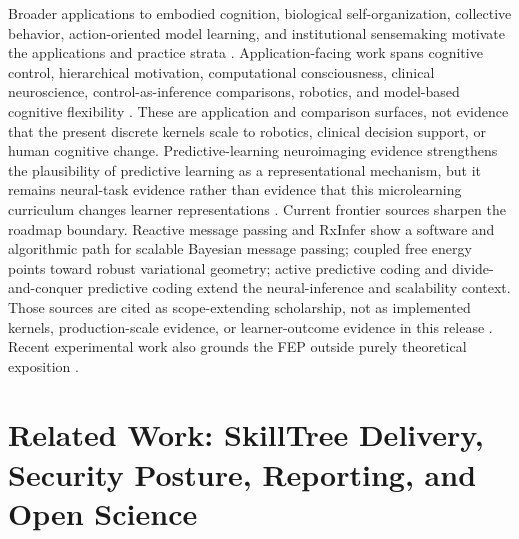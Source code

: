 \documentclass[
  english,
]{article}
\begin{document}
Broader applications to embodied cognition, biological
self-organization, collective behavior, action-oriented model learning,
and institutional sensemaking motivate the applications and practice
strata
\citep{clark2016surfing, friston2013life, tschantz2020learning, ramstead2018answering, friston2019particular}.
Application-facing work spans cognitive control, hierarchical
motivation, computational consciousness, clinical neuroscience,
control-as-inference comparisons, robotics, and model-based cognitive
flexibility
\citep{pezzulo2012cognitive_control, pezzulo2018hierarchical_active_inference, vilas2022active_consciousness, smith2021clinical_predictive_coding, pezzulo2023generating_meaning, watson2020active_control_inference, millidge2020active_control_relationship, schwartenbeck2015addiction_active_bayes, lanillos2021active_robotics_survey, catal2021robot_navigation_active_inference, queisser2021robot_active_inference, sales2019cognitive_flexibility_active_inference}.
These are application and comparison surfaces, not evidence that the
present discrete kernels scale to robotics, clinical decision support,
or human cognitive change. Predictive-learning neuroimaging evidence
strengthens the plausibility of predictive learning as a
representational mechanism, but it remains neural-task evidence rather
than evidence that this microlearning curriculum changes learner
representations \citep{greco2024predictive_learning_geometry}. Current
frontier sources sharpen the roadmap boundary. Reactive message passing
and RxInfer show a software and algorithmic path for scalable Bayesian
message passing; coupled free energy points toward robust variational
geometry; active predictive coding and divide-and-conquer predictive
coding extend the neural-inference and scalability context. Those
sources are cited as scope-extending scholarship, not as implemented
kernels, production-scale evidence, or learner-outcome evidence in this
release
\citep{bagaev2023reactive_message_passing, bagaev2023rxinfer, nelson2025coupled_free_energy, rao2024active_predictive_coding, sennesh2024dcpc}.
Recent experimental work also grounds the FEP outside purely theoretical
exposition \citep{isomura2023experimental}.

\newpage

\section{Related Work: SkillTree Delivery, Security Posture, Reporting,
and Open
Science}\label{sec:related-work-skilltree-security-reporting-open-science}
\end{document}
